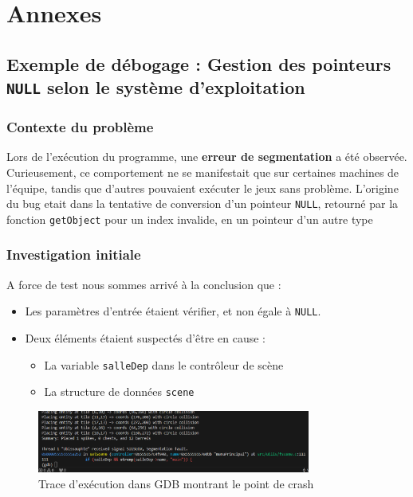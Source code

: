 \documentclass[a4paper,11pt]{article}
\begin{document}
\section{Annexes}

\subsection{Exemple de débogage : Gestion des pointeurs \texttt{NULL} selon le système d'exploitation}
\subsubsection{Contexte du problème}
Lors de l'exécution du programme, une \textbf{erreur de segmentation} a été observée. Curieusement, ce comportement ne se manifestait que sur certaines machines de l'équipe, tandis que d'autres pouvaient exécuter le jeux sans problème. 
L'origine du bug etait dans la tentative de conversion d'un pointeur \texttt{NULL}, retourné par la fonction \texttt{getObject} pour un index invalide, en un pointeur d'un autre type

\subsubsection{Investigation initiale}
A force de test nous sommes arrivé à la conclusion que :
\begin{itemize} 
    \item Les paramètres d'entrée étaient vérifier, et non égale à \texttt{NULL}. 
    \item Deux éléments étaient suspectés d'être en cause : 
    \begin{itemize} \item La variable \texttt{salleDep} dans le contrôleur de scène 
    \item La structure de données \texttt{scene} 
    \end{itemize} 
\end{itemize}

\begin{figure}[h]
\centering
\includegraphics[width=0.8\textwidth]{./img/gdbSIGEGV.png}
\caption{Trace d'exécution dans GDB montrant le point de crash}
\label{fig:gdbSIGEGV}
\end{figure}
\end{document}
